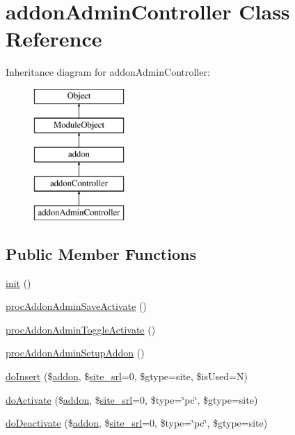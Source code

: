 \hypertarget{classaddonAdminController}{}\section{addon\+Admin\+Controller Class Reference}
\label{classaddonAdminController}
Inheritance diagram for addon\+Admin\+Controller\+:\begin{figure}[H]
\begin{center}
\leavevmode
\includegraphics[height=5.000000cm]{classaddonAdminController}
\end{center}
\end{figure}
\subsection*{Public Member Functions}
\begin{DoxyCompactItemize}
\item 
\hyperlink{classaddonAdminController_a429384cd42bbb45d8a9f6be4073cc7b6}{init} ()
\item 
\hyperlink{classaddonAdminController_a59081b3459b0704e973fdbe2fc5d14d1}{proc\+Addon\+Admin\+Save\+Activate} ()
\item 
\hyperlink{classaddonAdminController_a97250cb7cb4dc0b78789b8a9186d94d4}{proc\+Addon\+Admin\+Toggle\+Activate} ()
\item 
\hyperlink{classaddonAdminController_a43db10c21a41c0ebbeb13257d9bf86ea}{proc\+Addon\+Admin\+Setup\+Addon} ()
\item 
\hyperlink{classaddonAdminController_a2c7a72d246f1849ec46ec903e3716687}{do\+Insert} (\$\hyperlink{classaddon}{addon}, \$\hyperlink{ko_8install_8php_a8b1406b4ad1048041558dce6bfe89004}{site\+\_\+srl}=0, \$gtype=\textquotesingle{}site\textquotesingle{}, \$is\+Used=\textquotesingle{}N\textquotesingle{})
\item 
\hyperlink{classaddonAdminController_a7495a02dcec27d46266774be08befa30}{do\+Activate} (\$\hyperlink{classaddon}{addon}, \$\hyperlink{ko_8install_8php_a8b1406b4ad1048041558dce6bfe89004}{site\+\_\+srl}=0, \$type=\char`\"{}pc\char`\"{}, \$gtype=\textquotesingle{}site\textquotesingle{})
\item 
\hyperlink{classaddonAdminController_aaa0b9b5e928d9827cb837908b436f65e}{do\+Deactivate} (\$\hyperlink{classaddon}{addon}, \$\hyperlink{ko_8install_8php_a8b1406b4ad1048041558dce6bfe89004}{site\+\_\+srl}=0, \$type=\char`\"{}pc\char`\"{}, \$gtype=\textquotesingle{}site\textquotesingle{})
\end{DoxyCompactItemize}
